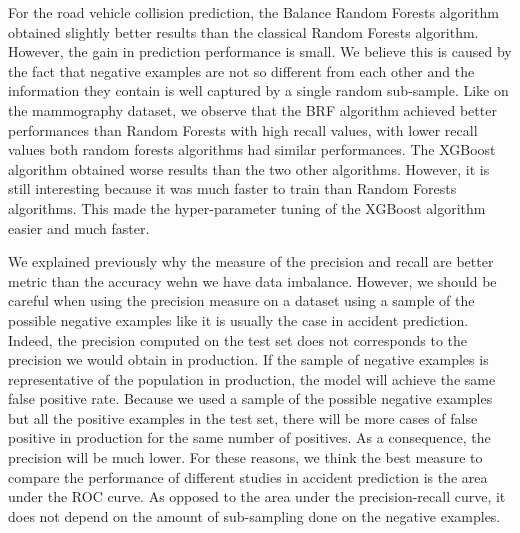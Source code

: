 \documentclass[conference]{IEEEtran}
\begin{document}
For the road vehicle collision prediction, the Balance Random Forests algorithm obtained slightly better results than the classical Random Forests algorithm. However, the gain in prediction performance is small. We believe this is caused by the fact that negative examples are not so different from each other and the information they contain is well captured by a single random sub-sample. Like on the mammography dataset, we observe that the BRF algorithm achieved better performances than Random Forests with high recall values, with lower recall values both random forests algorithms had similar performances. The XGBoost algorithm obtained worse results than the two other algorithms. However, it is still interesting because it was much faster to train than Random Forests algorithms. This made the hyper-parameter tuning of the XGBoost algorithm easier and much faster. 

We explained previously why the measure of the precision and recall are better metric than the accuracy wehn we have data imbalance. However, we should be careful when using the precision measure on a dataset using a sample of the possible negative examples like it is usually the case in accident prediction. Indeed, the precision computed on the test set does not corresponds to the precision we would obtain in production.
If the sample of negative examples is representative of the population
in production, the model will achieve the same false positive rate.
Because we used a sample of the possible negative examples but all the 
positive examples in the test set, there will be more cases of false positive in production for the same number of positives. As a consequence, the precision will be much lower.
For these reasons, we think the best measure to compare the performance of
different studies in accident prediction is the area under the ROC curve.
As opposed to the area under the precision-recall curve, it does not depend on the amount of sub-sampling done on the negative examples. 
\end{document}
